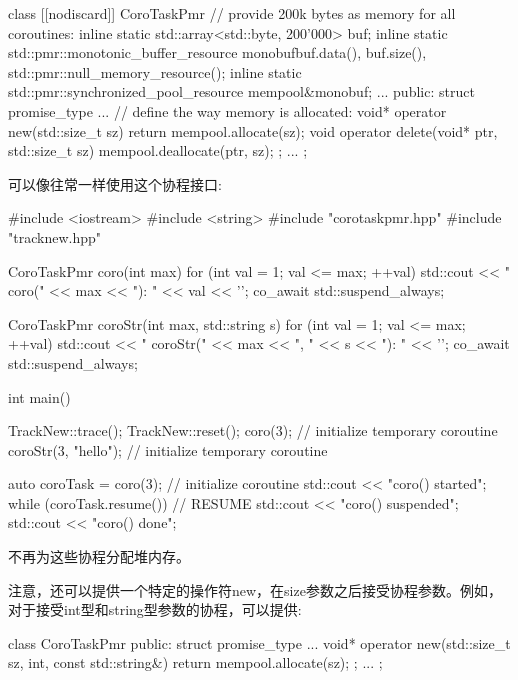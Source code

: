 \begin{cpp}
class [[nodiscard]] CoroTaskPmr {
	// provide 200k bytes as memory for all coroutines:
	inline static std::array<std::byte, 200’000> buf;
	inline static std::pmr::monotonic_buffer_resource
		monobuf{buf.data(), buf.size(), std::pmr::null_memory_resource()};
	inline static std::pmr::synchronized_pool_resource mempool{&monobuf};
	...
public:
	struct promise_type {
		...
			// define the way memory is allocated:
		void* operator new(std::size_t sz) {
			return mempool.allocate(sz);
		}
		void operator delete(void* ptr, std::size_t sz) {
			mempool.deallocate(ptr, sz);
		}
	};
	...
};
\end{cpp}

可以像往常一样使用这个协程接口:


\begin{cpp}
#include <iostream>
#include <string>
#include "corotaskpmr.hpp"
#include "tracknew.hpp"

CoroTaskPmr coro(int max)
{
	for (int val = 1; val <= max; ++val) {
		std::cout << "    coro(" << max << "): " << val << '\n';
		co_await std::suspend_always{};
	}
}

CoroTaskPmr coroStr(int max, std::string s)
{
	for (int val = 1; val <= max; ++val) {
		std::cout << "    coroStr(" << max << ", " << s << "): " << '\n';
		co_await std::suspend_always{};
	}
}

int main()
{
	TrackNew::trace();
	TrackNew::reset();
	coro(3); // initialize temporary coroutine
	coroStr(3, "hello"); // initialize temporary coroutine
	
	auto coroTask = coro(3); // initialize coroutine
	std::cout << "coro() started\n";
	while (coroTask.resume()) { // RESUME
		std::cout << "coro() suspended\n";
	}
	std::cout << "coro() done\n";
}
\end{cpp}

不再为这些协程分配堆内存。

注意，还可以提供一个特定的操作符new，在size参数之后接受协程参数。例如，对于接受int型和string型参数的协程，可以提供:

\begin{cpp}
class CoroTaskPmr {
	public:
	struct promise_type {
		...
		void* operator new(std::size_t sz, int, const std::string&) {
			return mempool.allocate(sz);
		}
	};
	...
};
\end{cpp}


